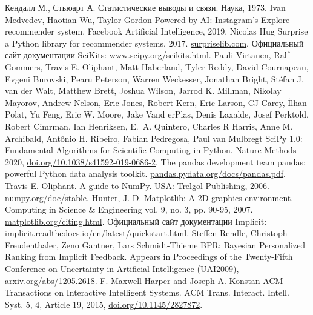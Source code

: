 \documentclass[a4paper,article,14pt]{extarticle}
\begin{document}
\begin{thebibliography}{1}
 Кендалл М., Стьюарт А. \flqq Статистические выводы и связи\frqq. Наука, 1973.
 Ivan Medvedev, Haotian Wu, Taylor Gordon \flqq Powered by AI: Instagram’s Explore recommender system\frqq. Facebook Artificial Intelligence, 2019.
 Nicolas Hug \flqq Surprise a Python library for recommender systems\frqq, 2017. \href{http://surpriselib.com}{surpriselib.com}.
 Официальный сайт документации SciKits: \href{https://www.scipy.org/scikits.html}{www.scipy.org/scikits.html}.
 Pauli Virtanen, Ralf Gommers, Travis E. Oliphant,
Matt Haberland, Tyler Reddy, David Cournapeau, Evgeni Burovski,
Pearu Peterson, Warren Weckesser, Jonathan Bright, St{\'e}fan J. van der Walt,
Matthew Brett, Joshua Wilson,  Jarrod K. Millman, Nikolay Mayorov, 
Andrew Nelson, Eric Jones, Robert Kern,  Eric Larson,
CJ Carey, {\.I}lhan Polat,  Yu {Feng},  Eric W. {Moore},
Jake {Vand erPlas},  Denis {Laxalde},  Josef
{Perktold},  Robert {Cimrman},  Ian {Henriksen},  E.~A.
{Quintero},  Charles R {Harris},  Anne M. {Archibald}, 
Ant{\^o}nio H. {Ribeiro},  Fabian {Pedregosa},  Paul
{van Mulbregt} \flqq SciPy 1.0: Fundamental Algorithms for Scientific
Computing in Python\frqq. Nature Methods 2020, \href{https://doi.org/10.1038/s41592-019-0686-2}{doi.org/10.1038/s41592-019-0686-2}.
 The pandas development team \flqq pandas: powerful Python data analysis toolkit\frqq. \href{https://pandas.pydata.org/docs/pandas.pdf}{pandas.pydata.org/docs/pandas.pdf}.
 Travis E. Oliphant. \flqq A guide to NumPy\frqq. USA: Trelgol Publishing, 2006. \href{https://numpy.org/doc/stable/}{numpy.org/doc/stable}.
 Hunter, J. D. \flqq Matplotlib: A 2D graphics environment\frqq. Computing in Science \& Engineering vol. 9, no. 3, pp. 90-95, 2007. \href{https://matplotlib.org/citing.html}{matplotlib.org/citing.html}.
 Официальный сайт документации Implicit: \href{https://implicit.readthedocs.io/en/latest/quickstart.html}{implicit.readthedocs.io/en/latest/quickstart.html}.
 Steffen Rendle, Christoph Freudenthaler, Zeno Gantner, Lars Schmidt-Thieme \flqq BPR: Bayesian Personalized Ranking from Implicit Feedback\frqq. 	Appears in Proceedings of the Twenty-Fifth Conference on Uncertainty in Artificial Intelligence (UAI2009), \href{https://arxiv.org/abs/1205.2618}{arxiv.org/abs/1205.2618}.
 F. Maxwell Harper and Joseph A. Konstan \flqq ACM Transactions on Interactive Intelligent Systems\frqq. ACM Trans. Interact. Intell. Syst. 5, 4, Article 19, 2015, \href{https://doi.org/10.1145/2827872}{doi.org/10.1145/2827872}.
\end{thebibliography}
\end{document}
